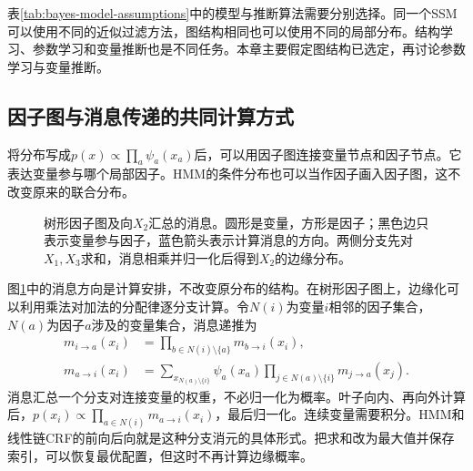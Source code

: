 表\ref{tab:bayes-model-assumptions}中的模型与推断算法需要分别选择。同一个SSM可以使用不同的近似过滤方法，图结构相同也可以使用不同的局部分布。结构学习、参数学习和变量推断也是不同任务。本章主要假定图结构已选定，再讨论参数学习与变量推断。

\subsection{因子图与消息传递的共同计算方式}
将分布写成$p(x)\propto\prod_a\psi_a(x_a)$后，可以用因子图连接变量节点和因子节点。它表达变量参与哪个局部因子。HMM的条件分布也可以当作因子画入因子图，这不改变原来的联合分布。

\begin{figure}[htbp]
\centering
{}
\caption{树形因子图及向$X_2$汇总的消息。圆形是变量，方形是因子；黑色边只表示变量参与因子，蓝色箭头表示计算消息的方向。两侧分支先对$X_1,X_3$求和，消息相乘并归一化后得到$X_2$的边缘分布。}
\label{fig:bayes-factor-messages}
\end{figure}

图\ref{fig:bayes-factor-messages}中的消息方向是计算安排，不改变原分布的结构。在树形因子图上，边缘化可以利用乘法对加法的分配律逐分支计算。令$N(i)$为变量$i$相邻的因子集合，$N(a)$为因子$a$涉及的变量集合，消息递推为
\begin{align}
 m_{i\to a}(x_i)&=\prod_{b\in N(i)\setminus\{a\}}m_{b\to i}(x_i),\\
 m_{a\to i}(x_i)&=\sum_{x_{N(a)\setminus\{i\}}}\psi_a(x_a)
 \prod_{j\in N(a)\setminus\{i\}}m_{j\to a}(x_j).
\end{align}
消息汇总一个分支对连接变量的权重，不必归一化为概率。叶子向内、再向外计算后，$p(x_i)\propto\prod_{a\in N(i)}m_{a\to i}(x_i)$，最后归一化。连续变量需要积分。HMM和线性链CRF的前向后向就是这种分支消元的具体形式。把求和改为最大值并保存索引，可以恢复最优配置，但这时不再计算边缘概率。

